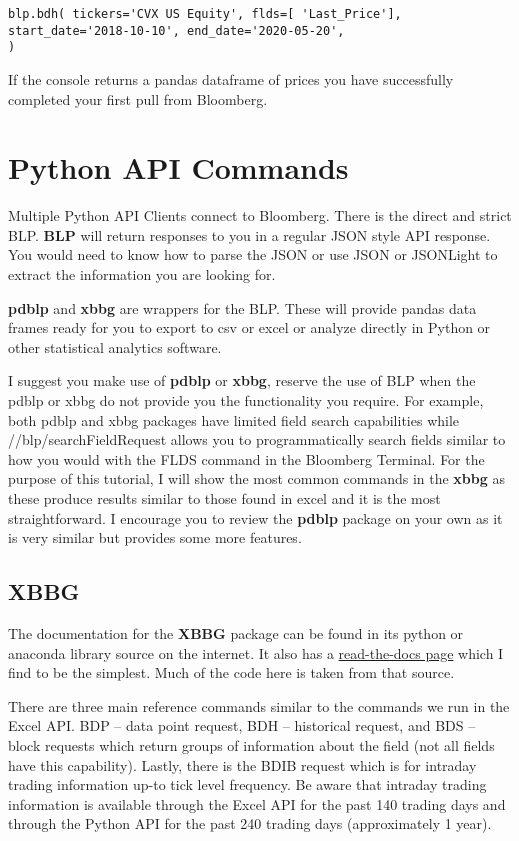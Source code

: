 \documentclass[]{book}
\begin{document}
\begin{verbatim}
blp.bdh( tickers='CVX US Equity', flds=[ 'Last_Price'], 
start_date='2018-10-10', end_date='2020-05-20',
)
\end{verbatim}

If the console returns a pandas dataframe of prices you have
successfully completed your first pull from Bloomberg.

\chapter{Python API Commands}\label{python-api-commands}

Multiple Python API Clients connect to Bloomberg. There is the direct
and strict BLP. \textbf{BLP} will return responses to you in a regular
JSON style API response. You would need to know how to parse the JSON or
use JSON or JSONLight to extract the information you are looking for.

\textbf{pdblp} and \textbf{xbbg} are wrappers for the BLP. These will
provide pandas data frames ready for you to export to csv or excel or
analyze directly in Python or other statistical analytics software.

I suggest you make use of \textbf{pdblp} or \textbf{xbbg}, reserve the
use of BLP when the pdblp or xbbg do not provide you the functionality
you require. For example, both pdblp and xbbg packages have limited
field search capabilities while //blp/searchFieldRequest allows you to
programmatically search fields similar to how you would with the FLDS
command in the Bloomberg Terminal. For the purpose of this tutorial, I
will show the most common commands in the \textbf{xbbg} as these produce
results similar to those found in excel and it is the most
straightforward. I encourage you to review the \textbf{pdblp} package on
your own as it is very similar but provides some more features.

\section{XBBG}\label{xbbg}

The documentation for the \textbf{XBBG} package can be found in its
python or anaconda library source on the internet. It also has a
\href{https://xbbg.readthedocs.io/en/latest/}{read-the-docs page} which
I find to be the simplest. Much of the code here is taken from that
source.

There are three main reference commands similar to the commands we run
in the Excel API. BDP -- data point request, BDH -- historical request,
and BDS -- block requests which return groups of information about the
field (not all fields have this capability). Lastly, there is the BDIB
request which is for intraday trading information up-to tick level
frequency. Be aware that intraday trading information is available
through the Excel API for the past 140 trading days and through the
Python API for the past 240 trading days (approximately 1 year).
\end{document}
